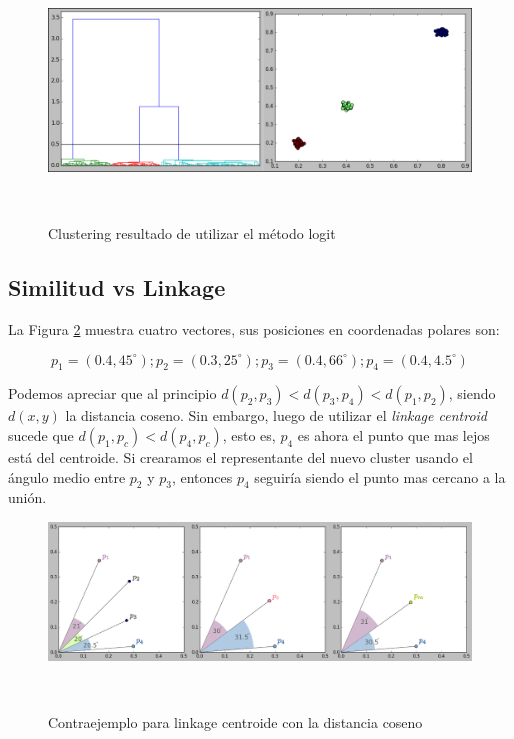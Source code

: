 \begin{figure}[h!]
                                                                                                                        
\begin{minipage}[b]{\textwidth}
    \includegraphics[width=\textwidth]{img/3pop_logit.png}
    \caption{Clustering resultado de utilizar el m\'etodo logit}
    \label{fig:3logit}
\end{minipage} ~

\end{figure}  


\subsection{Similitud vs Linkage}

La Figura \ref{fig:cos_cen} muestra cuatro vectores, sus posiciones en coordenadas
polares son: 

$$ p_1 = (0.4, 45^\circ);  p_2 = (0.3, 25^\circ); p_3 = (0.4, 66^\circ); p_4 = (0.4, 4.5^\circ)$$

Podemos apreciar que al principio $d(p_2,p_3) < d(p_3,p_4) < d(p_1,p_2)$, siendo
$d(x,y)$ la distancia coseno. Sin embargo, luego de utilizar el 
\textit{linkage centroid} sucede que $d(p_1,p_c) < d(p_4,p_c)$, esto es, $p_4$
es ahora el punto que mas lejos est\'a del centroide. Si crearamos el representante
del nuevo cluster usando el \'angulo medio entre $p_2$ y $p_3$, entonces $p_4$
seguir\'ia siendo el punto mas cercano a la uni\'on. \\

\begin{figure}[h!]
                                                                                                                        
\begin{minipage}[b]{\textwidth}
    \includegraphics[width=\textwidth]{img/cosine_centroid.png}
    \caption{Contraejemplo para linkage centroide con la distancia coseno}
    \label{fig:cos_cen}
\end{minipage} ~

\end{figure}  

